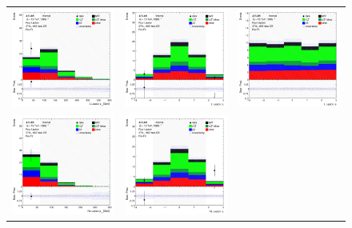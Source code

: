 \begin{figure}[htbp]
  \begin{tabular}{ccc}


    \includegraphics[width=.3\textwidth]{figures/PreFitPlots/lep4_tWZ_3T1L_L_lepton_pt.png} &
    \includegraphics[width=.3\textwidth]{figures/PreFitPlots/lep4_tWZ_3T1L_L_lepton_eta.png} &
    \includegraphics[width=.3\textwidth]{figures/PreFitPlots/lep4_tWZ_3T1L_L_lepton_phi.png} \\
    \includegraphics[width=.3\textwidth]{figures/PreFitPlots/lep4_tWZ_3T1L_NL_lepton_pt.png} &
    \includegraphics[width=.3\textwidth]{figures/PreFitPlots/lep4_tWZ_3T1L_NL_lepton_eta.png} &

\end{tabular}
\end{figure}
